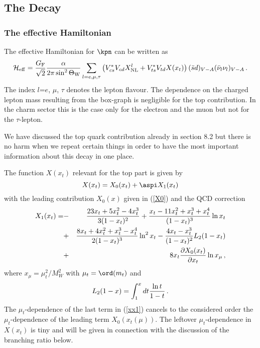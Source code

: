 \subsection{The Decay \kpnn}
            \label{sec:HeffRareKB:kpnn}
\subsubsection{The effective Hamiltonian}
The effective Hamiltonian for $\kpn$  can
be written as
\begin{equation}\label{hkpn} 
{\cal H}_{\rm eff}={G_{\rm F} \over{\sqrt 2}}{\alpha\over 2\pi 
\sin^2\Theta_{\rm W}}
 \sum_{l=e,\mu,\tau}\left( V^{\ast}_{cs}V_{cd} X^l_{\rm NL}+
V^{\ast}_{ts}V_{td} X(x_t)\right)
 (\bar sd)_{V-A}(\bar\nu_l\nu_l)_{V-A} \, .
\end{equation}
The index $l$=$e$, $\mu$, $\tau$ denotes the lepton flavour.
The dependence on the charged lepton mass resulting from the box-graph
is negligible for the top contribution. In the charm sector this is the
case only for the electron and the muon but not for the $\tau$-lepton.

We have discussed the top quark contribution already in section 8.2
but there is no harm when we repeat certain things in order to
have the most important information about this decay in one place.

The function $X(x_t)$ relevant for the top part is given by
\begin{equation}\label{xx9} 
X(x_t)=X_0(x_t)+\aspi X_1(x_t) 
\end{equation}
with the leading contribution $X_0(x)$ given in (\ref{X0})
and the QCD correction \cite{BB2}
\begin{eqnarray}\label{xx1}
X_1(x_t)=&-&{23x_t+5x_t^2-4x_t^3\over 3(1-x_t)^2}
+{x_t-11x_t^2+x_t^3+x_t^4\over (1-x_t)^3}\ln x_t
\nonumber\\
&+&{8x_t+4x_t^2+x_t^3-x_t^4\over 2(1-x_t)^3}\ln^2 x_t
-{4x_t-x_t^3\over (1-x_t)^2}L_2(1-x_t)
\nonumber\\
&+&8x_t{\partial X_0(x_t)\over\partial x_t}\ln x_\mu\,,
\end{eqnarray}
where $x_\mu=\mu_t^2/M^2_W$ with $\mu_t=\ord(m_t)$ and
\begin{equation}\label{l2UU} 
L_2(1-x)=\int^x_1 dt {\ln t\over 1-t}   \,.
\end{equation}
The $\mu_t$-dependence of the last term in (\ref{xx1}) cancels to the
considered order the $\mu_t$-dependence of the leading term 
$X_0(x_t(\mu))$.
The leftover $\mu_t$-dependence in $X(x_t)$ is tiny and will be given
in connection with the discussion of the branching ratio below.

